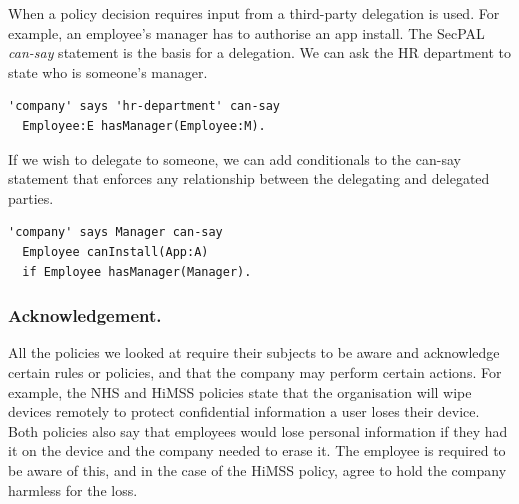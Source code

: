 \documentclass[thesis.tex]{subfiles}
\begin{document}
When a policy decision requires input from a third-party delegation is used.
For example, an employee's manager has to authorise an app install.
The SecPAL \emph{can-say} statement is the basis for a delegation.
We can ask the HR department to state who is someone's manager.
\begin{lstlisting}
'company' says 'hr-department' can-say
  Employee:E hasManager(Employee:M).
\end{lstlisting}
If we wish to delegate to someone, we can add conditionals to the can-say statement that enforces any relationship between the delegating and delegated parties.
\begin{lstlisting}
'company' says Manager can-say
  Employee canInstall(App:A)
  if Employee hasManager(Manager).
\end{lstlisting}

\subsubsection{Acknowledgement.}

All the policies we looked at require their subjects to be aware and acknowledge certain rules or policies,
  and that the company may perform certain actions.
For example, the NHS and \ac{HiMSS} policies state that the organisation will wipe devices remotely to protect confidential information a user loses their device.
Both policies also say that employees would lose personal information if they had it on the device and the company needed to erase it.
The employee is required to be aware of this, and in the case of the \ac{HiMSS} policy, agree to hold the company harmless for the loss.
\end{document}
